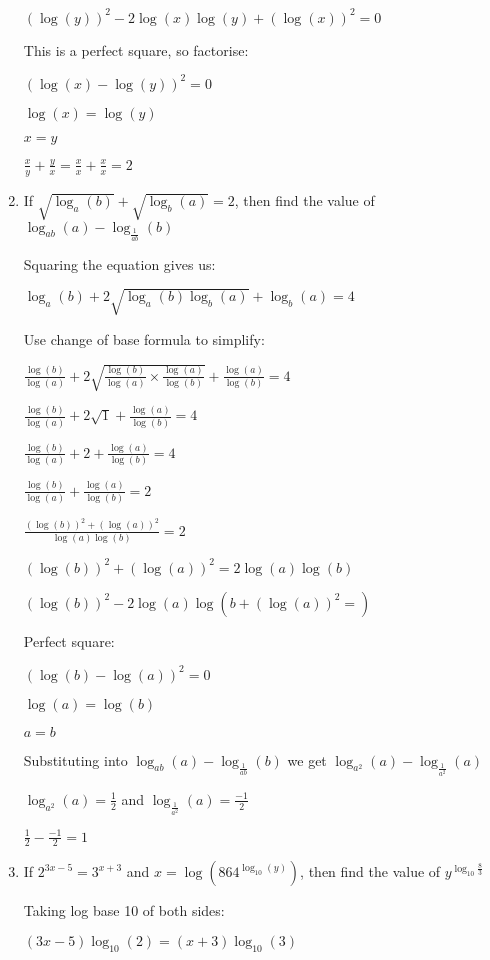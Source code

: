 \documentclass[../main.tex]{subfiles}
\begin{document}
\begin{enumerate}[itemsep=0.4cm]
    \((\log(y))^2 -2\log(x)\log(y) + (\log(x))^2=0\)

    This is a perfect square, so factorise:

    \((\log(x)-\log(y))^2=0\)

    \(\log(x)=\log(y)\)

    \(x=y\)

    \(\frac{x}{y}+\frac{y}{x}=\frac{x}{x}+\frac{x}{x}=2\)

    \item 
    If $\sqrt{\log_a(b)}+\sqrt{\log_b(a)}=2$, then find the value of $\log_{ab}(a)-\log_{\frac{1}{ab}}(b)$

    Squaring the equation gives us:

    \(\log_a(b)+2\sqrt{\log_a(b)\log_b(a)}+\log_b(a)=4\)

    Use change of base formula to simplify:

    \(\frac{\log(b)}{\log(a)}+2\sqrt{\frac{\log(b)}{\log(a)}\times \frac{\log(a)}{\log(b)}}+\frac{\log(a)}{\log(b)}=4 \)

    \(\frac{\log(b)}{\log(a)}+2\sqrt{1}+\frac{\log(a)}{\log(b)}=4 \)

    \(\frac{\log(b)}{\log(a)}+2+\frac{\log(a)}{\log(b)}=4 \)

    \(\frac{\log(b)}{\log(a)}+\frac{\log(a)}{\log(b)}=2 \)

    \(\frac{(\log(b))^2+(\log(a))^2}{\log(a)\log(b)} =2\)

    \((\log(b))^2+(\log(a))^2=2\log(a)\log(b)\)

    \((\log(b))^2-2\log(a)\log(b+(\log(a))^2=)\)

    Perfect square:

    \((\log(b)-\log(a))^2=0 \)

    \(\log(a)=\log(b)\)

    \(a=b\)

    Substituting into $\log_{ab}(a)-\log_{\frac{1}{ab}}(b)$ we get $\log_{a^2}(a)-\log_{\frac{1}{a^2}}(a)$

    $\log_{a^2}(a)=\frac{1}{2}$ and $\log_{\frac{1}{a^2}}(a)=\frac{-1}{2}$

    \(\frac{1}{2}-\frac{-1}{2}=1\)


    \item 
    If $2^{3x-5}=3^{x+3}$ and $x=\log(864^{\log_{10}(y)})$, then find the value of $y^{\log_{10}\frac{8}{3}}$

    Taking log base 10 of both sides:

    \((3x-5)\log_{10}(2)=(x+3)\log_{10}(3)\)


\end{enumerate}
\end{document}
